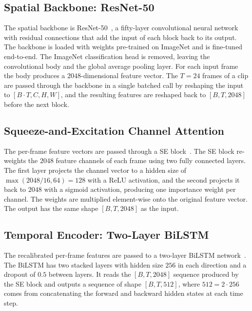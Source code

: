 \subsection{Spatial Backbone: ResNet-50}\label{sec:method_resnet}

The spatial backbone is ResNet-50~\cite{he_resnet_2016}, a fifty-layer convolutional neural network with residual connections that add the input of each block back to its output. The backbone is loaded with weights pre-trained on ImageNet and is fine-tuned end-to-end. The ImageNet classification head is removed, leaving the convolutional body and the global average pooling layer. For each input frame the body produces a $2048$-dimensional feature vector. The $T = 24$ frames of a clip are passed through the backbone in a single batched call by reshaping the input to $[B \cdot T, C, H, W]$, and the resulting features are reshaped back to $[B, T, 2048]$ before the next block.

\subsection{Squeeze-and-Excitation Channel Attention}\label{sec:method_se}

The per-frame feature vectors are passed through a \ac{SE} block~\cite{hu_squeeze_2018}. The \ac{SE} block re-weights the $2048$ feature channels of each frame using two fully connected layers. The first layer projects the channel vector to a hidden size of $\max(2048 / 16, 64) = 128$ with a ReLU activation, and the second projects it back to $2048$ with a sigmoid activation, producing one importance weight per channel. The weights are multiplied element-wise onto the original feature vector. The output has the same shape $[B, T, 2048]$ as the input.

\subsection{Temporal Encoder: Two-Layer \ac{BiLSTM}}\label{sec:method_bilstm}

The recalibrated per-frame features are passed to a two-layer \ac{BiLSTM} network~\cite{hochreiter_lstm_1997}. The \ac{BiLSTM} has two stacked layers with hidden size $256$ in each direction and a dropout of $0.5$ between layers. It reads the $[B, T, 2048]$ sequence produced by the \ac{SE} block and outputs a sequence of shape $[B, T, 512]$, where $512 = 2 \cdot 256$ comes from concatenating the forward and backward hidden states at each time step.


